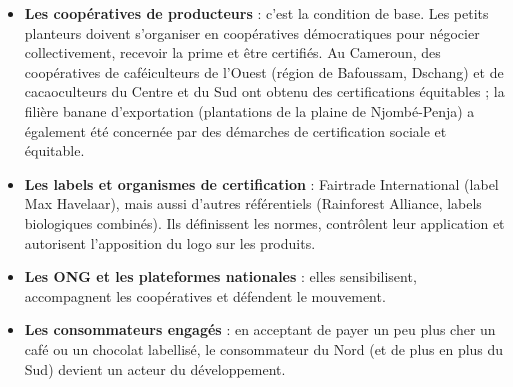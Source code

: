 \documentclass[11pt]{article}
\begin{document}
\begin{itemize}
\item \textbf{Les coopératives de producteurs} : c'est la condition de base. Les petits planteurs doivent s'organiser en coopératives démocratiques pour négocier collectivement, recevoir la prime et être certifiés. Au Cameroun, des coopératives de caféiculteurs de l'Ouest (région de Bafoussam, Dschang) et de cacaoculteurs du Centre et du Sud ont obtenu des certifications équitables ; la filière banane d'exportation (plantations de la plaine de Njombé-Penja) a également été concernée par des démarches de certification sociale et équitable.
\item \textbf{Les labels et organismes de certification} : Fairtrade International (label Max Havelaar), mais aussi d'autres référentiels (Rainforest Alliance, labels biologiques combinés). Ils définissent les normes, contrôlent leur application et autorisent l'apposition du logo sur les produits.
\item \textbf{Les ONG et les plateformes nationales} : elles sensibilisent, accompagnent les coopératives et défendent le mouvement.
\item \textbf{Les consommateurs engagés} : en acceptant de payer un peu plus cher un café ou un chocolat labellisé, le consommateur du Nord (et de plus en plus du Sud) devient un acteur du développement.
\end{itemize}
\end{document}
